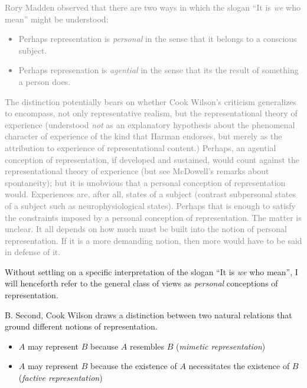 \documentclass[11pt]{article}
\newcommand{\discuss}[2][gray]{\textcolor{#1}{#2}}
\begin{document}
\discuss{Rory Madden observed that there are two ways in which the slogan ``It is \emph{we} who mean'' might be understood:
\begin{itemize}
	\item Perhaps representation is \emph{personal} in the sense that it belongs to a conscious subject.
	\item Perhaps represenation is \emph{agential} in the sense that its the result of something a person does.
\end{itemize}
The distinction potentially bears on whether Cook Wilson's criticism generalizes to encompass, not only representative realism, but the representational theory of experience (understood \emph{not} as an explanatory hypothesis about the phenomenal character of experience of the kind that Harman endorses, but merely as the attribution to experience of representational content.) Perhaps, an agential conception of representation, if developed and sustained, would count against the representational theory of experience (but see McDowell's remarks about spontaneity); but it is unobvious that a personal conception of representation would. Experiences are, after all, states of a subject (contrast subpersonal states of a subject such as neurophysiological states). Perhaps that is enough to satisfy the constraints imposed by a personal conception of representation. The matter is unclear. It all depends on how much must be built into the notion of personal representation. If it is a more demanding notion, then more would have to be said in defense of it.}

Without settling on a specific interpretation of the slogan ``It is \emph{we} who mean'', I will henceforth refer to the general class of views as \emph{personal} conceptions of representation.

B. Second, Cook Wilson draws a distinction between two natural relations that ground different notions of representation.
\begin{itemize}
	\item \( A \) may represent \( B \) because \( A \) resembles \( B \) (\emph{mimetic representation})
	\item \( A \) may represent \( B \) because the existence of \( A \) necessitates the existence of \( B \) (\emph{factive representation})
\end{itemize}
\end{document}
